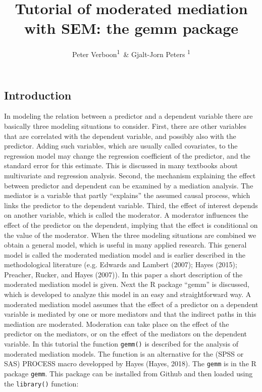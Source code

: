 \documentclass[man,floatsintext]{apa6}
\title{Tutorial of moderated mediation with SEM: the gemm package}
\author{Peter Verboon\textsuperscript{1}~\& Gjalt-Jorn Peters
\textsuperscript{1 }}
\date{}
\affiliation{
\vspace{0.5cm}
\textsuperscript{1} Open University}
\theoremstyle{definition}
\theoremstyle{definition}
\theoremstyle{definition}
\theoremstyle{remark}
\begin{document}
\maketitle

\subsection{Introduction}\label{introduction}

In modeling the relation between a predictor and a dependent variable
there are basically three modeling situations to consider. First, there
are other variables that are correlated with the dependent variable, and
possibly also with the predictor. Adding such variables, which are
usually called covariates, to the regression model may change the
regression coefficient of the predictor, and the standard error for this
estimate. This is discussed in many textbooks about multivariate and
regression analysis. Second, the mechanism explaining the effect between
predictor and dependent can be examined by a mediation analysis. The
mediator is a variable that partly \enquote{explains} the assumed causal
process, which links the predictor to the dependent variable. Third, the
effect of interest depends on another variable, which is called the
moderator. A moderator influences the effect of the predictor on the
dependent, implying that the effect is conditional on the value of the
moderator. When the three modeling situations are combined we obtain a
general model, which is useful in many applied research. This general
model is called the moderated mediation model and is earlier described
in the methodological literature (e.g. Edwards and Lambert (2007); Hayes
(2015); Preacher, Rucker, and Hayes (2007)). In this paper a short
description of the moderated mediation model is given. Next the R
package \enquote{gemm} is discussed, which is developed to analyze this
model in an easy and straightforward way. A moderated mediation model
assumes that the effect of a predictor on a dependent variable is
mediated by one or more mediators and that the indirect paths in this
mediation are moderated. Moderation can take place on the effect of the
predictor on the mediators, or on the effect of the mediators on the
dependent variable. In this tutorial the function \texttt{gemm()} is
described for the analysis of moderated mediation models. The function
is an alternative for the (SPSS or SAS) PROCESS macro developped by
Hayes (Hayes, 2018). The \texttt{gemm} is in the R package
\texttt{gemm}. This package can be installed from Github and then loaded
using the \texttt{library()} function:
\end{document}

